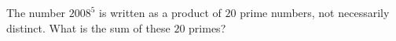 The number $2008^5$ is written as a product of $20$ prime numbers, not necessarily distinct. What is the sum of these $20$ primes?
